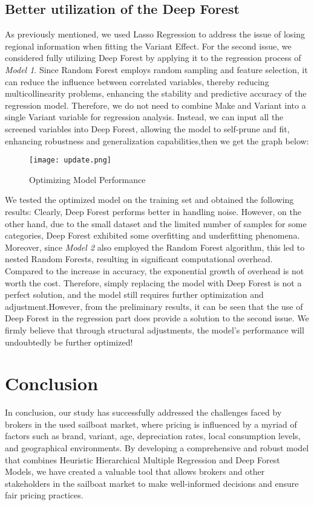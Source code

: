 \documentclass[12pt]{article}  %
\begin{document}
\subsection{Better utilization of the Deep Forest}
As previously mentioned, we used Lasso Regression to address the issue of losing regional information when fitting the Variant Effect. For the second issue, we considered fully utilizing Deep Forest by applying it to the regression process of \emph{Model 1}. Since Random Forest employs random sampling and feature selection, it can reduce the influence between correlated variables, thereby reducing multicollinearity problems, enhancing the stability and predictive accuracy of the regression model. Therefore, we do not need to combine Make and Variant into a single Variant variable for regression analysis. Instead, we can input all the screened variables into Deep Forest, allowing the model to self-prune and fit, enhancing robustness and generalization capabilities,then we get the graph below:

\begin{figure}[htbp]
    \centering
    \texttt{[image: update.png]}
    \caption{Optimizing Model Performance}\label{fig:update}
\end{figure}

We tested the optimized model on the training set and obtained the following results: Clearly, Deep Forest performs better in handling noise. However, on the other hand, due to the small dataset and the limited number of samples for some categories, Deep Forest exhibited some overfitting and underfitting phenomena. Moreover, since \emph{Model 2} also employed the Random Forest algorithm, this led to nested Random Forests, resulting in significant computational overhead. Compared to the increase in accuracy, the exponential growth of overhead is not worth the cost. Therefore, simply replacing the model with Deep Forest is not a perfect solution, and the model still requires further optimization and adjustment.However, from the preliminary results, it can be seen that the use of Deep Forest in the regression part does provide a solution to the second issue. We firmly believe that through structural adjustments, the model's performance will undoubtedly be further optimized!


\section{Conclusion}
In conclusion, our study has successfully addressed the challenges faced by brokers in the used sailboat market, where pricing is influenced by a myriad of factors such as brand, variant, age, depreciation rates, local consumption levels, and geographical environments. By developing a comprehensive and robust model that combines Heuristic Hierarchical Multiple Regression and Deep Forest Models, we have created a valuable tool that allows brokers and other stakeholders in the sailboat market to make well-informed decisions and ensure fair pricing practices.
\end{document}
